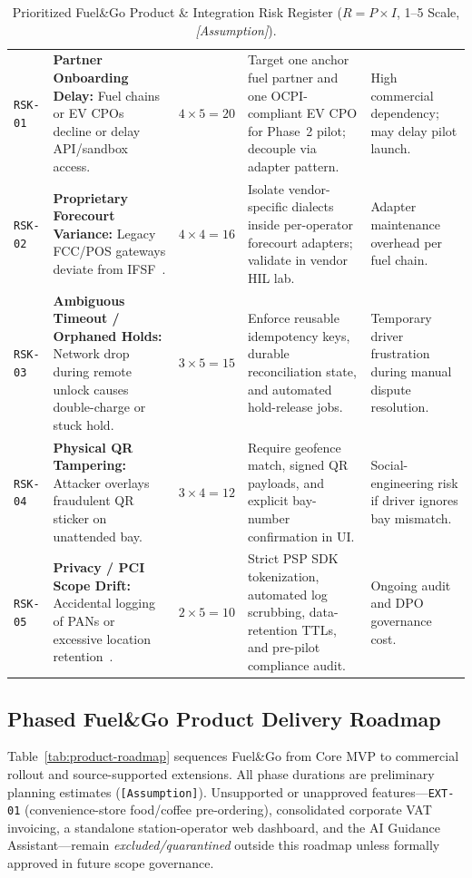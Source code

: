 \begin{table}[htbp]
  \centering
  \caption{Prioritized Fuel\&Go Product \& Integration Risk Register ($R = P \times I$, 1--5 Scale, \emph{[Assumption]}).}
  \label{tab:risk-register}
  {\footnotesize
  \begin{tabularx}{\linewidth}{@{}P{11mm} P{34mm} P{16mm} P{48mm} L@{}}
    \toprule
     &  &  &  &  \\
    \midrule
    \texttt{RSK-01} & \textbf{Partner Onboarding Delay:} Fuel chains or EV CPOs decline or delay API/sandbox access. & $4 \times 5 = 20$ & Target one anchor fuel partner and one OCPI-compliant EV CPO for Phase~2 pilot; decouple via adapter pattern. & High commercial dependency; may delay pilot launch. \\
    \texttt{RSK-02} & \textbf{Proprietary Forecourt Variance:} Legacy FCC/POS gateways deviate from IFSF~\cite{ifsf_specs}. & $4 \times 4 = 16$ & Isolate vendor-specific dialects inside per-operator forecourt adapters; validate in vendor HIL lab. & Adapter maintenance overhead per fuel chain. \\
    \texttt{RSK-03} & \textbf{Ambiguous Timeout / Orphaned Holds:} Network drop during remote unlock causes double-charge or stuck hold. & $3 \times 5 = 15$ & Enforce reusable idempotency keys, durable reconciliation state, and automated hold-release jobs. & Temporary driver frustration during manual dispute resolution. \\
    \texttt{RSK-04} & \textbf{Physical QR Tampering:} Attacker overlays fraudulent QR sticker on unattended bay. & $3 \times 4 = 12$ & Require geofence match, signed QR payloads, and explicit bay-number confirmation in UI. & Social-engineering risk if driver ignores bay mismatch. \\
    \texttt{RSK-05} & \textbf{Privacy / PCI Scope Drift:} Accidental logging of PANs or excessive location retention~\cite{pcissc2024pcidss401,israel1981ppl}. & $2 \times 5 = 10$ & Strict PSP SDK tokenization, automated log scrubbing, data-retention TTLs, and pre-pilot compliance audit. & Ongoing audit and DPO governance cost. \\
    \bottomrule
  \end{tabularx}
  }
\end{table}

\subsection{Phased Fuel\&Go Product Delivery Roadmap}
Table~\ref{tab:product-roadmap} sequences Fuel\&Go from Core MVP to commercial rollout and source-supported extensions. All phase durations are preliminary planning estimates (\texttt{[Assumption]}). Unsupported or unapproved features—\texttt{EXT-01} (convenience-store food/coffee pre-ordering), consolidated corporate VAT invoicing, a standalone station-operator web dashboard, and the AI Guidance Assistant—remain \emph{excluded/quarantined} outside this roadmap unless formally approved in future scope governance.

